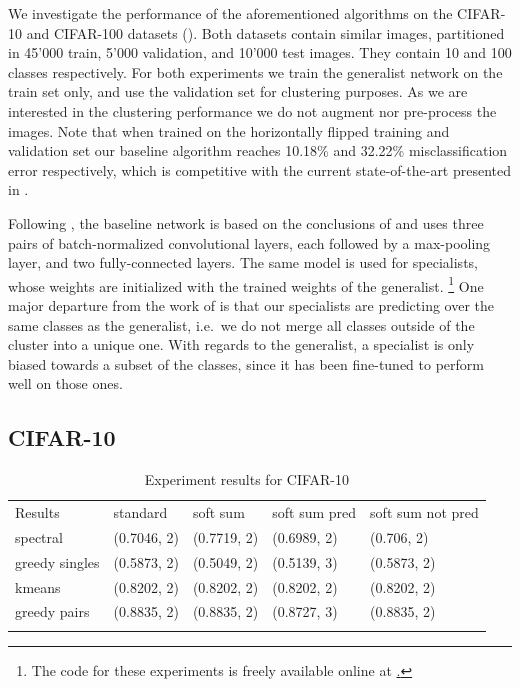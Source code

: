 \documentclass[12pt]{article}
\begin{document}
We investigate the performance of the aforementioned algorithms on the
CIFAR-10 and CIFAR-100 datasets (\cite{cifar}). Both datasets contain
similar images, partitioned in 45'000 train, 5'000 validation, and
10'000 test images. They contain 10 and 100 classes respectively. For
both experiments we train the generalist network on the train set only,
and use the validation set for clustering purposes. As we are interested
in the clustering performance we do not augment nor pre-process the
images. Note that when trained on the horizontally flipped training and
validation set our baseline algorithm reaches 10.18\% and 32.22\%
misclassification error respectively, which is competitive with the
current state-of-the-art presented in \cite{allcnn}.

Following \cite{binaryconnect}, the baseline network is based on the
conclusions of \cite{vgg} and uses three pairs of batch-normalized
convolutional layers, each followed by a max-pooling layer, and two
fully-connected layers. The same model is used for specialists, whose
weights are initialized with the trained weights of the generalist.
\footnote{The code for these experiments is freely available online at
  \href{http://www.github.com/seba-1511/specialists}.}
One major departure from the work of \cite{darkknowledge} is that our
specialists are predicting over the same classes as the generalist,
i.e.~we do not merge all classes outside of the cluster into a unique
one. With regards to the generalist, a specialist is only biased towards
a subset of the classes, since it has been fine-tuned to perform well on
those ones.

\subsection{CIFAR-10}\label{cifar-10}

\begin{longtable}[c]{@{}lllll@{}}
\toprule\addlinespace
Results & standard & soft sum & soft sum pred & soft sum not pred
\\\addlinespace
\midrule\endhead
spectral & (0.7046, 2) & (0.7719, 2) & (0.6989, 2) & (0.706, 2)
\\\addlinespace
greedy singles & (0.5873, 2) & (0.5049, 2) & (0.5139, 3) & (0.5873, 2)
\\\addlinespace
kmeans & (0.8202, 2) & (0.8202, 2) & (0.8202, 2) & (0.8202, 2)
\\\addlinespace
greedy pairs & (0.8835, 2) & (0.8835, 2) & (0.8727, 3) & (0.8835, 2)
\\\addlinespace
\bottomrule
\addlinespace
\caption{Experiment results for CIFAR-10}
\end{longtable}
\end{document}
